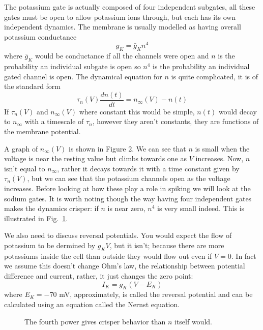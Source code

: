 \documentclass[11pt,a4paper]{scrartcl}
\begin{document}
The potassium gate is actually composed of four independent subgates,
all these gates must be open to allow potassium ions through, but each
has its own independent dynamics. The membrane is usually modelled as
having overall potassium conductance
\begin{equation}
g_{K}=\bar{g}_Kn^4
\end{equation}
where $\bar{g}_K$ would be conductance if all the channels were open
and $n$ is the probability an individual subgate is open so $n^4$ is
the probability an individual gated channel is open. The dynamical equation for $n$ is quite complicated, it is of the standard form
\begin{equation}
\tau_n(V)\frac{dn(t)}{dt}=n_\infty(V)-n(t)
\end{equation}
If $\tau_n(V)$ and $n_\infty(V)$ where constant this would be simple,
$n(t)$ would decay to $n_\infty$ with a timescale of $\tau_n$, however
they aren't constants, they are functions of the membrane potential. 

A graph of $n_\infty(V)$ is shown in Figure 2. We can see that $n$ is
small when the voltage is near the resting value but climbs towards
one as $V$ increases. Now, $n$ isn't equal to $n_\infty$, rather it
decays towards it with a time constant given by $\tau_n(V)$, but we
can see that the potassium channels open as the voltage
increases. Before looking at how these play a role in spiking we will
look at the sodium gates. It is worth noting though the way having
four independent gates makes the dynamics crisper: if $n$ is near
zero, $n^4$ is very small indeed. This is illustrated in
Fig.~\ref{fig:nfour}. 

We also need to discuss reversal potentials. You would expect the flow
of potassium to be dermined by $g_KV$, but it isn't; because there are
more potassiums inside the cell than outside they would flow out even
if $V=0$. In fact we assume this doesn't change Ohm's law, the
relationship between potential difference and current, rather, it just
changes the zero point:
\begin{equation}
I_K=g_K(V-E_K)
\end{equation}
where $E_K=-70$ mV, approximately, is called the reversal potential
and can be calculated using an equation called the Nernst equation.

\begin{figure}
\begin{center}

\end{center}
\caption{The fourth power gives crisper behavior than $n$ itself would.\label{fig:nfour}}
\end{figure}
\end{document}
